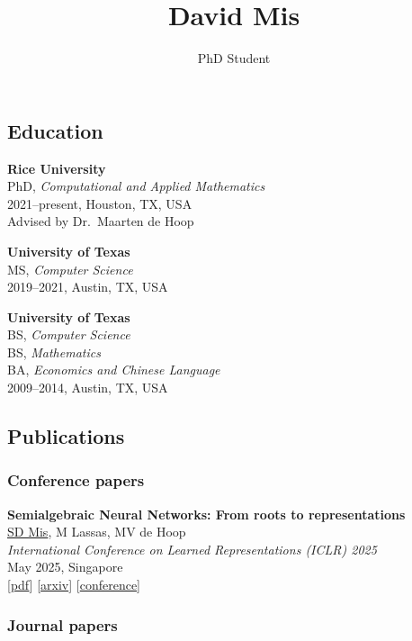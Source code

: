 \documentclass[
  letterpaper,
  DIV=11,
  numbers=noendperiod]{scrartcl}
\title{David Mis}
\subtitle{PhD Student}
\author{}
\date{}
\begin{document}
\maketitle


\label{heading}

\subsection{Education}\label{education}

\textbf{Rice University}\\
PhD, \emph{Computational and Applied Mathematics}\\
2021--present, Houston, TX, USA\\
Advised by Dr.~Maarten de Hoop

\textbf{University of Texas}\\
MS, \emph{Computer Science}\\
2019--2021, Austin, TX, USA

\textbf{University of Texas}\\
BS, \emph{Computer Science}\\
BS, \emph{Mathematics}\\
BA, \emph{Economics and Chinese Language}\\
2009--2014, Austin, TX, USA

\subsection{Publications}\label{publications}

\subsubsection{Conference papers}\label{conference-papers}

\textbf{Semialgebraic Neural Networks: From roots to representations}\\
\ul{SD Mis}, M Lassas, MV de Hoop\\
\emph{International Conference on Learned Representations (ICLR) 2025}\\
May 2025, Singapore\\
{[}\href{https://www.arxiv.org/pdf/2501.01564}{pdf}{]}
{[}\href{https://www.arxiv.org/abs/2501.01564}{arxiv}{]}
{[}\href{https://iclr.cc/virtual/2025/poster/27662}{conference}{]}

\subsubsection{Journal papers}\label{journal-papers}
\end{document}
